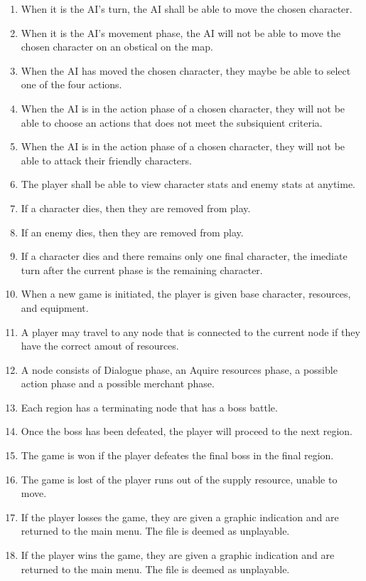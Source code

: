 \documentclass{article}
\begin{document}
\begin{enumerate}[{PGR}1. ]
	\item When it is the AI's turn, the AI shall be able to move the chosen character.
	\item When it is the AI's movement phase, the AI will not be able to move the chosen character on an obstical on the map.
	\item When the AI has moved the chosen character, they maybe be able to select one of the four actions.
	\item When the AI is in the action phase of a chosen character, they will not be able to choose an actions that does not meet the subsiquient criteria.
	\item When the AI is in the action phase of a chosen character, they will not be able to attack their friendly characters.
	\item The player shall be able to view character stats and enemy stats at anytime.
	\item If a character dies, then they are removed from play.
	\item If an enemy dies, then they are removed from play.
	\item If a character dies and there remains only one final character, the imediate turn after the current phase is the remaining character.
	\item When a new game is initiated, the player is given base character, resources, and equipment.
	\item A player may travel to any node that is connected to the current node if they have the correct amout of resources.
	\item A node consists of Dialogue phase, an Aquire resources phase, a possible action phase and a possible merchant phase.
	\item Each region has a terminating node that has a boss battle.
	\item Once the boss has been defeated, the player will proceed to the next region.
	\item The game is won if the player defeates the final boss in the final region.
	\item The game is lost of the player runs out of the supply resource, unable to move.
	\item If the player losses the game, they are given a graphic indication and are returned to the main menu. The file is deemed as unplayable.
	\item If the player wins the game, they are given a graphic indication and are returned to the main menu. The file is deemed as unplayable.

\end{enumerate}
\end{document}
